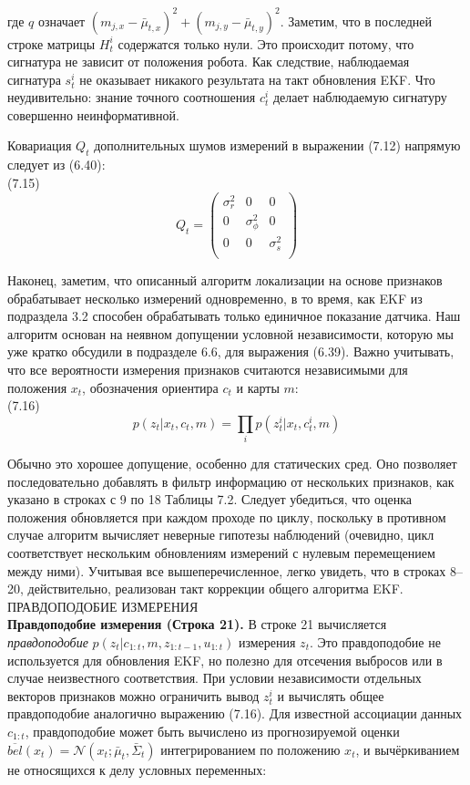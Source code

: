 \documentclass[10pt,a4paper]{article}
\begin{document}
где $q$ означает $(m_{j,x}-\bar{\mu}_{t,x})^2+(m_{j,y}-\bar{\mu}_{t,y})^2$. Заметим, что в последней строке матрицы $H^i_t$ содержатся только нули. Это происходит потому, что сигнатура не зависит от положения робота. Как следствие, наблюдаемая сигнатура $s^i_t$ не оказывает никакого результата на такт обновления EKF. Что неудивительно: знание точного соотношения $c^i_t$ делает наблюдаемую сигнатуру совершенно неинформативной.

Ковариация $Q_t$ дополнительных шумов измерений в выражении (7.12)
напрямую следует из (6.40):\\

(7.15)
\begin{equation*}
Q_t =\left(\begin{array}{ccc}
\sigma_r^2&0&0\\
0&\sigma_\phi^2&0\\
0&0&\sigma_s^2\\
\end{array}\right)
\end{equation*}

Наконец, заметим, что описанный алгоритм локализации на основе признаков обрабатывает несколько измерений одновременно, в то время, как EKF из подраздела 3.2 способен обрабатывать только единичное показание датчика. Наш алгоритм основан на неявном допущении условной независимости, которую мы уже кратко обсудили в подразделе 6.6, для выражения (6.39). Важно учитывать, что все вероятности измерения признаков считаются независимыми для положения $x_t$, обозначения ориентира $c_t$ и карты $m$:\\

(7.16)
$$p(z_t|x_t,c_t,m)=\prod_i p(z_t^i|x_t,c_t^i,m)$$

Обычно это хорошее допущение, особенно для статических сред. Оно позволяет последовательно добавлять в фильтр информацию от нескольких признаков, как указано в строках с 9 по 18 Таблицы 7.2. Следует убедиться, что оценка положения обновляется  при каждом проходе по циклу, поскольку в противном случае алгоритм вычисляет неверные гипотезы наблюдений (очевидно, цикл соответствует нескольким обновлениям измерений с нулевым перемещением между ними).
Учитывая все вышеперечисленное, легко увидеть, что в строках 8–20, действительно, реализован такт коррекции общего алгоритма EKF.\\

ПРАВДОПОДОБИЕ ИЗМЕРЕНИЯ\\
\textbf{Правдоподобие измерения (Строка 21).} В строке 21 вычисляется \textit{правдоподобие} $p(z_t |
c_{1:t}, m, z_{1:t-1}, u_{1:t})$ измерения $z_t$. Это правдоподобие не используется для обновления EKF, но полезно для отсечения выбросов или в случае неизвестного соответствия. При условии независимости отдельных векторов признаков можно ограничить вывод  $z_t^i$ и вычислять общее правдоподобие аналогично выражению (7.16). Для известной ассоциации данных $c_{1:t}$, правдоподобие может быть вычислено из прогнозируемой оценки $\overline{bel}(x_t) = \mathcal{N}(x_t; \bar{\mu}_t, \bar{\varSigma}_t)$ интегрированием по положению $x_t$, и вычёркиванием не относящихся к делу условных переменных:\\
\end{document}
